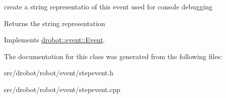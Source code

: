 create a string representatio of this event used for console debugging 

\begin{DoxyReturn}{Returns}
the string representation 
\end{DoxyReturn}


Implements \hyperlink{classdrobot_1_1event_1_1Event_a25b725cbb7dbdb4a41b9c4e9fc3785d8}{drobot\-::event\-::\-Event}.



The documentation for this class was generated from the following files\-:\begin{DoxyCompactItemize}
\item 
src/drobot/robot/event/stepevent.\-h\item 
src/drobot/robot/event/stepevent.\-cpp\end{DoxyCompactItemize}
